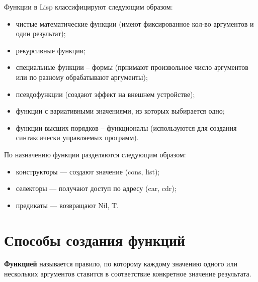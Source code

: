 \documentclass[a4paper,14pt, unknownkeysallowed]{extreport}
\begin{document}
Функции в Lisp классифицируют следующим образом:

\begin{itemize}
	\item чистые математические функции (имеют фиксированное кол-во аргументов и один результат);
	\item рекурсивные функции;
	\item специальные функции -- формы (прнимают произвольное число аргументов или по разному обрабатывают аргументы);
	\item псевдофункции (создают эффект на внешнем устройстве);
	\item функции с вариативными значениями, из которых выбирается одно;
	\item функции высших порядков -- функционалы (используются для создания синтаксически управляемых программ).
\end{itemize}

По назначению функции разделяются следующим образом:

\begin{itemize}
	\item конструкторы — создают значение (cons, list);
	\item селекторы — получают доступ по адресу (car, cdr); 
	\item предикаты — возвращают Nil, T.
\end{itemize}

\section{Способы создания функций}

\textbf{Функцией} называется правило, по которому каждому значению одного или нескольких аргументов ставится в соответствие конкретное значение результата.
\end{document}
